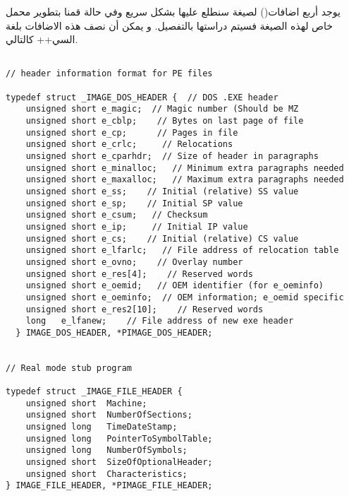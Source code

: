 \documentclass[document.tex]{subfiles}
\begin{document}

يوجد أربع اضافات() لصيغة  سنطلع عليها بشكل سريع وفي حالة قمنا بتطوير محمل خاص لهذه الصيغة فسيتم دراستها بالتفصيل. و يمكن أن نصف هذه الاضافات بلغة السي++ كالتالي.
\begin{english}

\lstset{numberstyle=\tiny,numbers=left,stepnumber=1,numbersep=5pt,tabsize=2,extendedchars=true,breaklines=true,frame=b,showspaces=false, showtabs=false,xleftmargin=10pt,framexleftmargin=10pt,framexrightmargin=5pt,framexbottommargin=4pt,showstringspaces=false,language=C++}


\begin{lstlisting}[label=pe_hdr,caption=\en{Portable Executable Header}]

// header information format for PE files 

typedef struct _IMAGE_DOS_HEADER {  // DOS .EXE header
    unsigned short e_magic;  // Magic number (Should be MZ
    unsigned short e_cblp;    // Bytes on last page of file
    unsigned short e_cp;      // Pages in file
    unsigned short e_crlc;     // Relocations
    unsigned short e_cparhdr;  // Size of header in paragraphs
    unsigned short e_minalloc;   // Minimum extra paragraphs needed
    unsigned short e_maxalloc;   // Maximum extra paragraphs needed
    unsigned short e_ss;    // Initial (relative) SS value
    unsigned short e_sp;    // Initial SP value
    unsigned short e_csum;   // Checksum
    unsigned short e_ip;     // Initial IP value
    unsigned short e_cs;    // Initial (relative) CS value
    unsigned short e_lfarlc;   // File address of relocation table
    unsigned short e_ovno;    // Overlay number
    unsigned short e_res[4];    // Reserved words
    unsigned short e_oemid;   // OEM identifier (for e_oeminfo)
    unsigned short e_oeminfo;  // OEM information; e_oemid specific
    unsigned short e_res2[10];    // Reserved words
    long   e_lfanew;    // File address of new exe header
  } IMAGE_DOS_HEADER, *PIMAGE_DOS_HEADER;

  
// Real mode stub program 

typedef struct _IMAGE_FILE_HEADER {
    unsigned short  Machine;
    unsigned short  NumberOfSections;
    unsigned long   TimeDateStamp;
    unsigned long   PointerToSymbolTable;
    unsigned long   NumberOfSymbols;
    unsigned short  SizeOfOptionalHeader;
    unsigned short  Characteristics;
} IMAGE_FILE_HEADER, *PIMAGE_FILE_HEADER;


\end{lstlisting}
\end{english}
\end{document}
